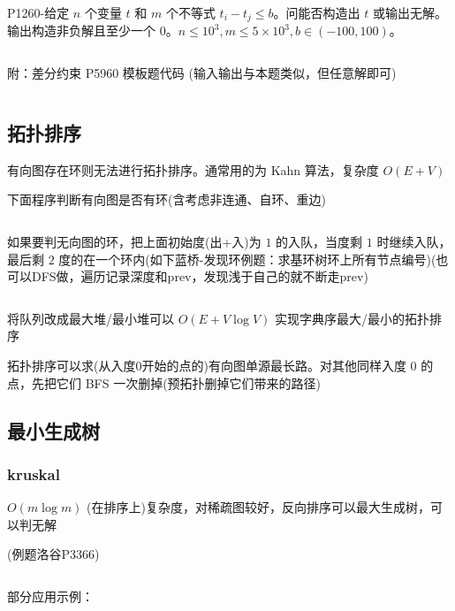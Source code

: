 \documentclass[twocolumn,10pt]{ctexart}
\begin{document}
\begin{notebox}
P1260-给定 $n$ 个变量 $t$ 和 $m$ 个不等式 $t_i-t_j\le b$。问能否构造出 $t$ 或输出无解。输出构造非负解且至少一个 $0$。$n\le 10^3,\allowbreak{}m\le 5\times10^3,\allowbreak{}b\in(-100,\allowbreak{}100)$。
\end{notebox}

\inputminted{cpp}{code/p1260_diff_constraints.cpp}

\begin{notebox}
附：差分约束 P5960 模板题代码 (输入输出与本题类似，但任意解即可)

\inputminted{cpp}{code/ext_040.cpp}
\end{notebox}

\subsection{拓扑排序}

有向图存在环则无法进行拓扑排序。通常用的为 Kahn 算法，复杂度 $O(E+V)$

下面程序判断有向图是否有环(含考虑非连通、自环、重边)

\inputminted{cpp}{code/ext_041.cpp}

如果要判无向图的环，把上面初始度(出+入)为 $1$ 的入队，当度剩 $1$ 时继续入队，最后剩 $2$ 度的在一个环内(如下蓝桥-发现环例题：求基环树环上所有节点编号)(也可以DFS做，遍历记录深度和prev，发现浅于自己的就不断走prev)

\inputminted{cpp}{code/topo2.cpp}

将队列改成最大堆/最小堆可以 $O(E+V\log V)$ 实现字典序最大/最小的拓扑排序

拓扑排序可以求(从入度0开始的点的)有向图单源最长路。对其他同样入度 $0$ 的点，先把它们 BFS 一次删掉(预拓扑删掉它们带来的路径)

\subsection{最小生成树}

\subsubsection{kruskal}

$O(m\log m)$ (在排序上)复杂度，对稀疏图较好，反向排序可以最大生成树，可以判无解

(例题洛谷P3366)

\inputminted{cpp}{code/ext_042.cpp}

部分应用示例：
\end{document}
